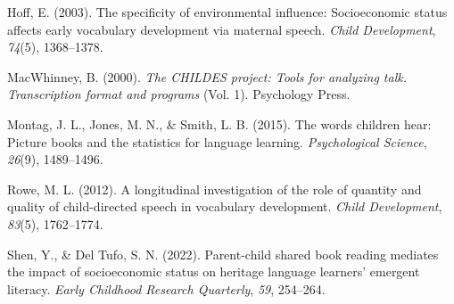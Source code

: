 \documentclass[10pt, letterpaper]{article}
\newenvironment{CSLReferences}%
  {}%
  {\par}
\begin{document}
\begin{CSLReferences}{1}{0}
\leavevmode{}%
Hoff, E. (2003). The specificity of environmental influence:
Socioeconomic status affects early vocabulary development via maternal
speech. \emph{Child Development}, \emph{74}(5), 1368--1378.

\leavevmode{}%
MacWhinney, B. (2000). \emph{The CHILDES project: Tools for analyzing
talk. Transcription format and programs} (Vol. 1). Psychology Press.

\leavevmode{}%
Montag, J. L., Jones, M. N., \& Smith, L. B. (2015). The words children
hear: Picture books and the statistics for language learning.
\emph{Psychological Science}, \emph{26}(9), 1489--1496.

\leavevmode{}%
Rowe, M. L. (2012). A longitudinal investigation of the role of quantity
and quality of child-directed speech in vocabulary development.
\emph{Child Development}, \emph{83}(5), 1762--1774.

\leavevmode{}%
Shen, Y., \& Del Tufo, S. N. (2022). Parent-child shared book reading
mediates the impact of socioeconomic status on heritage language
learners' emergent literacy. \emph{Early Childhood Research Quarterly},
\emph{59}, 254--264.

\end{CSLReferences}


\end{document}
